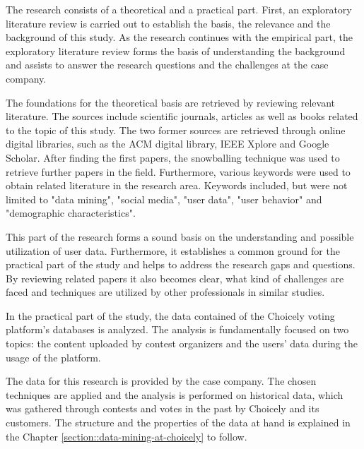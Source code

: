The research consists of a theoretical and a practical part. First, an exploratory literature review is carried out to establish the basis, the relevance and the background of this study. As the research continues with the empirical part, the exploratory literature review forms the basis of understanding the background and assists to answer the research questions and the challenges at the case company. 

The foundations for the theoretical basis are retrieved by reviewing relevant literature. The sources include scientific journals, articles as well as books related to the topic of this study. The two former sources are retrieved through online digital libraries, such as the ACM digital library, IEEE Xplore and Google Scholar. After finding the first papers, the snowballing technique was used to retrieve further papers in the field. Furthermore, various keywords were used to obtain related literature in the research area. Keywords included, but were not limited to "data mining", "social media", "user data", "user behavior" and "demographic characteristics". 

This part of the research forms a sound basis on the understanding and possible utilization of user data. Furthermore, it establishes a common ground for the practical part of the study and helps to address the research gaps and questions. By reviewing related papers it also becomes clear, what kind of challenges are faced and techniques are utilized by other professionals in similar studies.

In the practical part of the study, the data contained of the Choicely voting platform's databases is analyzed. The analysis is fundamentally focused on two topics: the content uploaded by contest organizers and the users' data during the usage of the platform. 


The data for this research is provided by the case company. The chosen techniques are applied and the analysis is performed on historical data, which was gathered through contests and votes in the past by Choicely and its customers. The structure and the properties of the data at hand is explained in the Chapter \ref{section::data-mining-at-choicely} to follow.

